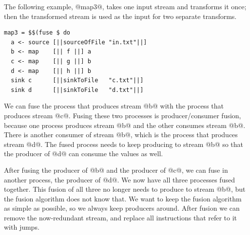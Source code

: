 The following example, @map3@, takes one input stream and transforms it once; then the transformed stream is used as the input for two separate transforms.

\begin{lstlisting}
map3 = $$(fuse $ do
  a <- source [||sourceOfFile "in.txt"||]
  b <- map    [|| f ||] a
  c <- map    [|| g ||] b
  d <- map    [|| h ||] b
  sink c      [||sinkToFile   "c.txt"||]
  sink d      [||sinkToFile   "d.txt"||]
\end{lstlisting}

We can fuse the process that produces stream @b@ with the process that produces stream @c@.
Fusing these two processes is producer/consumer fusion, because one process produces stream @b@ and the other consumes stream @b@.
There is another consumer of stream @b@, which is the process that produces stream @d@.
The fused process needs to keep producing to stream @b@ so that the producer of @d@ can consume the values as well.

After fusing the producer of @b@ and the producer of @c@, we can fuse in another process, the producer of @d@.
We now have all three processes fused together.
This fusion of all three no longer needs to produce to stream @b@, but the fusion algorithm does not know that.
We want to keep the fusion algorithm as simple as possible, so we always keep producers around.
After fusion we can remove the now-redundant stream, and replace all instructions that refer to it with jumps.






